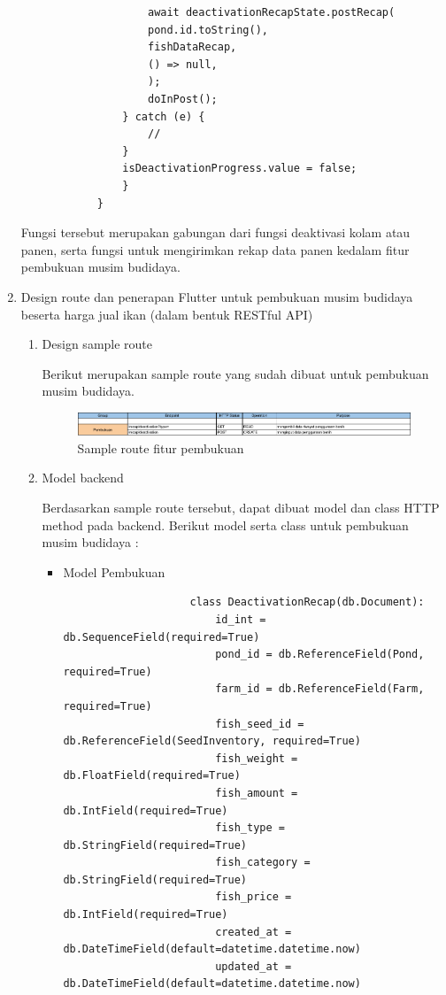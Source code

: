 \begin{spacing}{1.5}
\begin{enumerate}
\begin{lstlisting}
					await deactivationRecapState.postRecap(
					pond.id.toString(),
					fishDataRecap,
					() => null,
					);
					doInPost();
				} catch (e) {
					//
				}
				isDeactivationProgress.value = false;
				}
			}
		\end{lstlisting}

		Fungsi tersebut merupakan gabungan dari fungsi deaktivasi kolam atau panen, serta fungsi untuk mengirimkan rekap data panen kedalam fitur pembukuan musim budidaya. 

		\item Design route dan penerapan Flutter untuk pembukuan musim budidaya beserta harga jual ikan (dalam bentuk RESTful API) 
		
		\begin{enumerate}
			\item Design sample route
						
			Berikut merupakan sample route yang sudah dibuat untuk pembukuan musim budidaya.

			\begin{figure}[H]
				\centering
				\includegraphics[width=1\textwidth]{gambar/sprint5/pembukuan_route.png}
				\caption{Sample route fitur pembukuan}
			\end{figure}

			\item Model backend

			Berdasarkan sample route tersebut, dapat dibuat model dan class HTTP method pada backend. Berikut model serta class untuk pembukuan musim budidaya :

			\begin{itemize}
				\item Model Pembukuan
				
				\begin{lstlisting}
					class DeactivationRecap(db.Document):
						id_int = db.SequenceField(required=True)
						pond_id = db.ReferenceField(Pond, required=True)
						farm_id = db.ReferenceField(Farm, required=True)
						fish_seed_id = db.ReferenceField(SeedInventory, required=True)
						fish_weight = db.FloatField(required=True)
						fish_amount = db.IntField(required=True)
						fish_type = db.StringField(required=True)
						fish_category = db.StringField(required=True)
						fish_price = db.IntField(required=True)
						created_at = db.DateTimeField(default=datetime.datetime.now)
						updated_at = db.DateTimeField(default=datetime.datetime.now)
				\end{lstlisting}
			\end{itemize}


\end{enumerate}
\end{enumerate}
\end{spacing}
